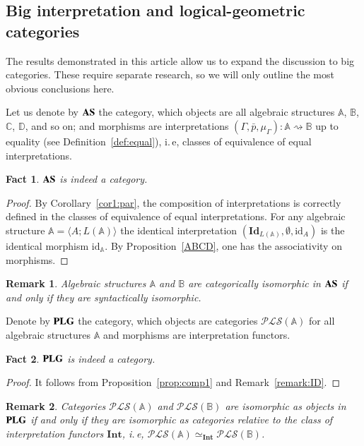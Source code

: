 \documentclass[12pt]{article}
\newtheorem{fact}{Fact}
\newtheorem{remark}{Remark}
\theoremstyle{definition}
\def\MA{{\mathbb{A}}}
\def\MB{{\mathbb{B}}}
\def\MC{{\mathbb{C}}}
\def\MD{{\mathbb{D}}}
\def\Int{{\mathbf{Int}}}
\def\PLS{{\mathcal{PLS}}}
\def\id{{\mathrm{id}}}
\def\Id{{\mathbf{Id}}}
\begin{document}
\subsection{Big interpretation and logical-geometric categories}\label{subsec:big_iso}

The results demonstrated in this article allow us to expand the discussion to big categories. These require separate research, so we will only outline the most obvious conclusions here.

Let us denote by ${\bf AS}$ the category, which objects are all algebraic structures $\MA$, $\MB$, $\MC$, $\MD$, and so on; and morphisms are interpretations $(\Gamma,\bar p,\mu_\Gamma)\colon \MA\rightsquigarrow\MB$ up to equality (see Definition~\ref{def:equal}), i.\,e, classes of equivalence of equal interpretations.

\begin{fact}
${\bf AS}$ is indeed a category.
\end{fact}

\begin{proof}
By Corollary~\ref{cor1:par}, the composition of interpretations is correctly defined in the classes of equivalence of equal interpretations. For any algebraic structure $\MA=\langle A; L(\MA)\rangle$ the identical interpretation $(\Id_{L(\MA)},\emptyset,\id_A)$ is the identical morphism $\id_\MA$. By Proposition~\ref{ABCD}, one has the associativity on morphisms. 
\end{proof}

\begin{remark}
Algebraic structures $\MA$ and $\MB$ are categorically isomorphic in ${\bf AS}$ if and only if they are syntactically isomorphic.
\end{remark}

Denote by ${\bf PLG}$ the category, which objects are categories $\PLS(\MA)$ for all algebraic structures $\MA$ and morphisms are interpretation functors.

\begin{fact}
${\bf PLG}$ is indeed a category.
\end{fact}

\begin{proof}
It follows from Proposition~\ref{prop:comp1} and Remark~\ref{remark:ID}.  
\end{proof}

\begin{remark}
Categories $\PLS(\MA)$ and $\PLS(\MB)$ are isomorphic as objects in ${\bf PLG}$ if and only if they are isomorphic as categories relative to the class of interpretation functors $\Int$, i.\,e, $\PLS(\MA)\simeq_\Int\PLS(\MB)$.
\end{remark}
\end{document}
